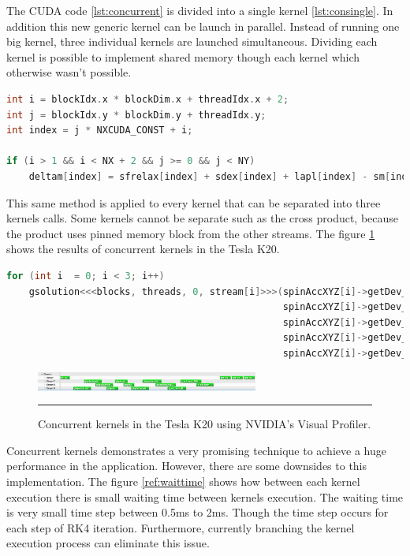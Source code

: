 The CUDA code \ref{lst:concurrent} is divided into a single kernel \ref{lst:consingle}. In addition this new generic kernel can be launch in parallel. Instead of running one big kernel, three individual kernels are launched simultaneous. Dividing each kernel is possible to implement shared memory though each kernel which otherwise wasn't possible. 

\begin{lstlisting}[language=C++, label={lst:consingle}, caption={Evaluation of individual coordinates of the Zhang and Li model}]
int i = blockIdx.x * blockDim.x + threadIdx.x + 2;
int j = blockIdx.y * blockDim.y + threadIdx.y;
int index = j * NXCUDA_CONST + i;

if (i > 1 && i < NX + 2 && j >= 0 && j < NY)
	deltam[index] = sfrelax[index] + sdex[index] + lapl[index] - sm[index];
\end{lstlisting}

This same method is applied to every kernel that can be separated into three kernels calls. Some kernels cannot be separate such as the cross product, because the product uses pinned memory block from the other streams.  The figure \ref{fig:concurrent} shows the results of concurrent kernels in the Tesla K20.
\begin{lstlisting}[language=C++, caption={Evaluate Zhang and Li model.}]
for (int i  = 0; i < 3; i++)
	gsolution<<<blocks, threads, 0, stream[i]>>>(spinAccXYZ[i]->getDev_deltam(),
												 spinAccXYZ[i]->getDev_sfrelax(), 
												 spinAccXYZ[i]->getDev_sm(), 
											 	 spinAccXYZ[i]->getDev_sdex(),
											 	 spinAccXYZ[i]->getDev_lapl());
\end{lstlisting}

\begin{figure}[htbp]
	\centering
		\includegraphics[width=0.65\textwidth]{Figures/concurent.png}
		\rule{35em}{0.2pt}
	\caption[Streams kernels Tesla K20]{Concurrent kernels in the Tesla K20 using NVIDIA's Visual Profiler.}
	\label{fig:concurrent}
\end{figure}

Concurrent kernels demonstrates a very promising technique to achieve a huge performance in the application. However, there are some downsides to this implementation. The figure \ref{ref:waittime} shows how between each kernel execution there is small waiting time between kernels execution. The waiting time is very small time step between 0.5ms to 2ms. Though the time step occurs for each step of RK4 iteration. Furthermore, currently branching the kernel execution process can eliminate this issue.

